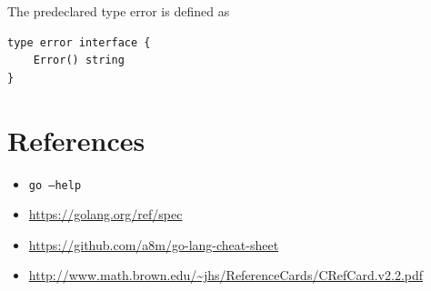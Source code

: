 \documentclass{article}
\begin{document}
\begin{multicols*}{3}
The predeclared type error is defined as

\begin{lstlisting}
type error interface {
    Error() string
}
\end{lstlisting}

  \parbox{\columnwidth}{
    \section*{References}

    \begin{itemize}[nosep]
    \item \texttt{go --help}
    \item \url{https://golang.org/ref/spec}
    \item \url{https://github.com/a8m/go-lang-cheat-sheet}
    \item \url{http://www.math.brown.edu/~jhs/ReferenceCards/CRefCard.v2.2.pdf}
    \end{itemize}

    \vspace{\baselineskip}
    \begin{center}
      \doclicenseText\\[0.25\baselineskip]

      \doclicenseImage
    \end{center}
  }
\end{multicols*}
\end{document}

